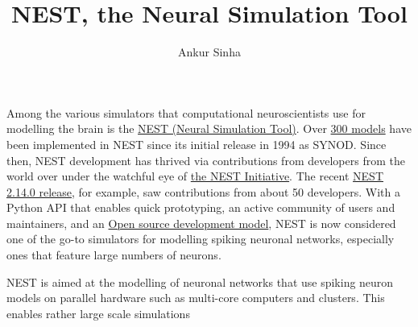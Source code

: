 \documentclass[12pt,a4paper]{article}
\title{NEST, the Neural Simulation Tool}
\author{Ankur Sinha}
\begin{document}
\maketitle
Among the various simulators that computational neuroscientists use for modelling the brain is the \href{http://www.nest-simulator.org}{NEST (Neural Simulation Tool)}. Over \href{http://www.nest-simulator.org/publications/}{300 models} have been implemented in NEST since its initial release in 1994 as SYNOD\@. Since then, NEST development has thrived via contributions from developers from the world over under the watchful eye of \href{http://www.nest-initiative.org/membership/}{the NEST Initiative}. The recent \href{https://github.com/nest/nest-simulator/releases/tag/v2.14.0 }{NEST 2.14.0 release}, for example, saw contributions from about 50 developers. With a Python API that enables quick prototyping, an active community of users and maintainers, and an \href{https://en.wikipedia.org/wiki/Open-source_model}{Open source development model}, NEST is now considered one of the go-to simulators for modelling spiking neuronal networks, especially ones that feature large numbers of neurons.

NEST is aimed at the modelling of neuronal networks that use spiking neuron models on parallel hardware such as multi-core computers and clusters. This enables rather large scale simulations
\end{document}
